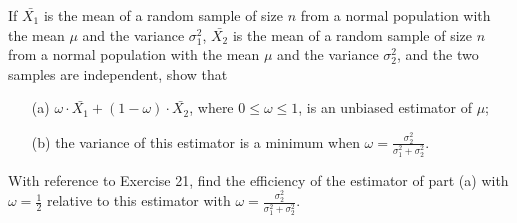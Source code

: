 \documentclass[11pt]{article}
\begin{document}
\begin{question}
    If \(\bar{X_1}\) is the mean of a random sample of size \(n\) from a normal population with the mean \(\mu\) and the variance \(\sigma_1^2\), \( \bar{X_2}\) is the mean of a random sample of size \(n\) from a normal population with the mean \(\mu\) and the variance \(\sigma_2^2\), and the two samples are independent, show that
    \begin{enumerate}
        \item[(a)] \(\omega \cdot \bar{X_1} + (1 - \omega) \cdot \bar{X_2}\), where \(0 \leq \omega \leq 1\), is an unbiased estimator of \(\mu\);
        \item[(b)] the variance of this estimator is a minimum when \(\omega =
              \frac{\sigma_2^2}{\sigma_1^2 + \sigma_2^2}\).
    \end{enumerate}
\end{question}

\begin{question}
    With reference to Exercise 21, find the efficiency of the estimator of part (a) with \(\omega = \frac{1}{2}\) relative to this estimator with \(\omega = \frac{\sigma_2^2}{\sigma_1^2 + \sigma_2^2}\).
\end{question}
\end{document}
